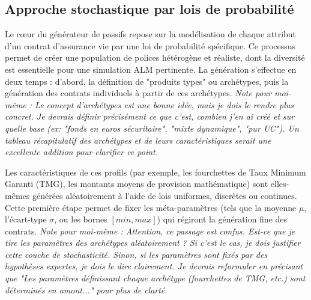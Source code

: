 \subsection{Approche stochastique par lois de probabilité}

Le cœur du générateur de passifs repose sur la modélisation de chaque attribut d'un contrat d'assurance vie par une loi de probabilité spécifique. Ce processus permet de créer une population de polices hétérogène et réaliste, dont la diversité est essentielle pour une simulation ALM pertinente. La génération s'effectue en deux temps : d'abord, la définition de "produits types" ou archétypes, puis la génération des contrats individuels à partir de ces archétypes. \textit{Note pour moi-même : Le concept d'archétypes est une bonne idée, mais je dois le rendre plus concret. Je devrais définir précisément ce que c'est, combien j'en ai créé et sur quelle base (ex: "fonds en euros sécuritaire", "mixte dynamique", "pur UC"). Un tableau récapitulatif des archétypes et de leurs caractéristiques serait une excellente addition pour clarifier ce point.}

Les caractéristiques de ces profils (par exemple, les fourchettes de Taux Minimum Garanti (TMG), les montants moyens de provision mathématique) sont elles-mêmes générées aléatoirement à l'aide de lois uniformes, discrètes ou continues. Cette première étape permet de fixer les méta-paramètres (tels que la moyenne $\mu$, l'écart-type $\sigma$, ou les bornes $[min, max]$) qui régiront la génération fine des contrats. \textit{Note pour moi-même : Attention, ce passage est confus. Est-ce que je tire les paramètres des archétypes aléatoirement ? Si c'est le cas, je dois justifier cette couche de stochasticité. Sinon, si les paramètres sont fixés par des hypothèses expertes, je dois le dire clairement. Je devrais reformuler en précisant que "Les paramètres définissant chaque archétype (fourchettes de TMG, etc.) sont déterminés en amont..." pour plus de clarté.}

